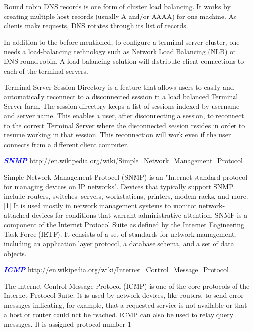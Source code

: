 \documentclass[9pt]{amsart}
\newcommand{\filldots}{\noindent \textbf {\textcolor {blue} {\dotfill}} }
\begin{document}
\begin{multicols}{2}
\noindent Round robin DNS records is one form of cluster load balancing. It works by creating multiple host records (usually A and/or AAAA) for one machine. As clients make requests, DNS rotates through its list of records.

\noindent In addition to the before mentioned, to configure a terminal server cluster, one needs a load-balancing technology such as Network Load Balancing (NLB) or DNS round robin. A load balancing solution will distribute client connections to each of the terminal servers.

\noindent Terminal Server Session Directory is a feature that allows users to easily and automatically reconnect to a disconnected session in a load balanced Terminal Server farm. The session directory keeps a list of sessions indexed by username and server name. This enables a user, after disconnecting a session, to reconnect to the correct Terminal Server where the disconnected session resides in order to resume working in that session. This reconnection will work even if the user connects from a different client computer.

\filldots
 
\noindent \textbf {\textcolor {blue} {\em SNMP}} 
\url {http://en.wikipedia.org/wiki/Simple_Network_Management_Protocol}

Simple Network Management Protocol (SNMP) is an "Internet-standard protocol for managing devices on IP networks". Devices that typically support SNMP include routers, switches, servers, workstations, printers, modem racks, and more.[1] It is used mostly in network management systems to monitor network-attached devices for conditions that warrant administrative attention. SNMP is a component of the Internet Protocol Suite as defined by the Internet Engineering Task Force (IETF). It consists of a set of standards for network management, including an application layer protocol, a database schema, and a set of data objects.

\filldots
 
\noindent \textbf {\textcolor {blue} {\em ICMP}} 
\url {http://en.wikipedia.org/wiki/Internet_Control_Message_Protocol}

The Internet Control Message Protocol (ICMP) is one of the core protocols of the Internet Protocol Suite. It is used by network devices, like routers, to send error messages indicating, for example, that a requested service is not available or that a host or router could not be reached. ICMP can also be used to relay query messages. It is assigned protocol number 1


\end{multicols}
\end{document}

